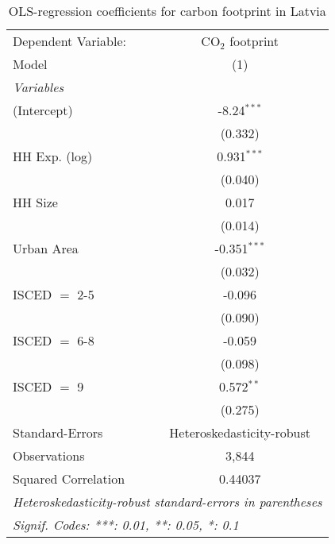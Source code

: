 
\begin{table}[htbp!]
   \centering
   \small
   \begin{adjustbox}{width = 1\textwidth, max height = 0.95\textheight, center}
      \begin{threeparttable}[b]
         \caption{\label{tab:OLS_2_LVA} OLS-regression coefficients for carbon footprint in Latvia}
         \begin{tabular}{lc}
            \tabularnewline \midrule \midrule
            Dependent Variable: & CO$_{2}$ footprint\\  
            Model               & (1)\\  
            \midrule
            \emph{Variables}\\
            (Intercept)         & -8.24$^{***}$\\   
                                & (0.332)\\   
            HH Exp. (log)       & 0.931$^{***}$\\   
                                & (0.040)\\   
            HH Size             & 0.017\\   
                                & (0.014)\\   
            Urban Area          & -0.351$^{***}$\\   
                                & (0.032)\\   
            ISCED $=$ 2-5       & -0.096\\   
                                & (0.090)\\   
            ISCED $=$ 6-8       & -0.059\\   
                                & (0.098)\\   
            ISCED $=$ 9         & 0.572$^{**}$\\   
                                & (0.275)\\   
            \midrule 
            Standard-Errors     & Heteroskedasticity-robust \\   
            Observations        & 3,844\\  
            Squared Correlation & 0.44037\\  
            \midrule \midrule
            \multicolumn{2}{l}{\emph{Heteroskedasticity-robust standard-errors in parentheses}}\\
            \multicolumn{2}{l}{\emph{Signif. Codes: ***: 0.01, **: 0.05, *: 0.1}}\\
         \end{tabular}
         

\end{threeparttable}
\end{adjustbox}
\end{table}
